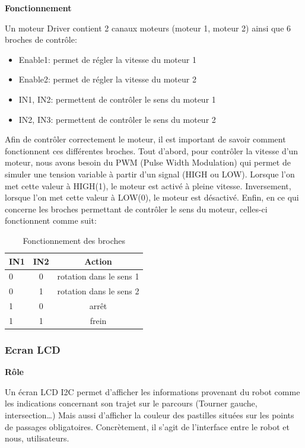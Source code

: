 \documentclass[11pt,a4paper]{article}
\begin{document}
\textbf{Fonctionnement}

Un moteur Driver contient 2 canaux moteurs (moteur 1, moteur 2) ainsi que 6 broches de contrôle:
\begin{itemize}
    \item Enable1: permet de régler la vitesse du moteur 1
    \item Enable2: permet de régler la vitesse du moteur 2
    \item IN1, IN2: permettent de contrôler le sens du moteur 1
    \item IN2, IN3: permettent de contrôler le sens du moteur 2
\end{itemize}
Afin de contrôler correctement le moteur, il est important de savoir comment fonctionnent ces différentes broches. 
Tout d'abord, pour contrôler la vitesse d'un moteur, nous avons besoin du PWM (Pulse Width Modulation) qui permet de simuler une tension variable à partir d'un signal (HIGH ou LOW). 
Lorsque l'on met cette valeur à HIGH(1), le moteur est activé à pleine vitesse. 
Inversement, lorsque l'on met cette valeur à LOW(0), le moteur est désactivé.
Enfin, en ce qui concerne les broches permettant de contrôler le sens du moteur, celles-ci fonctionnent comme suit:

\begin{table}[htbp]
\centering
\renewcommand{\arraystretch}{1.5}
\small
\begin{tabular}{|l|c|c|}
\hline
\textbf{IN1} & \textbf{ IN2} & \textbf{Action}  \\ \hline
0 & 0 & rotation dans le sens 1\\ \hline
0 & 1 & rotation dans le sens 2\\ \hline
1 & 0 & arrêt \\ \hline
1 & 1 & frein \\ \hline
\end{tabular}
\caption{Fonctionnement des broches}
\end{table}

\subsubsection{Ecran LCD}
\textbf{Rôle}

Un écran LCD I2C permet d’afficher les informations provenant du robot comme les indications concernant son trajet sur le parcours (Tourner gauche, intersection…)
Mais aussi d’afficher la couleur des pastilles situées sur les points de passages obligatoires.
Concrètement, il s’agit de l’interface entre le robot et nous, utilisateurs.
\end{document}
